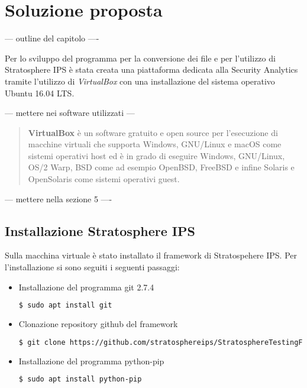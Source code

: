 \documentclass[../main.tex]{subfiles}
\begin{document}
\chapter{Soluzione proposta}

--- outline del capitolo ----

Per lo sviluppo del programma per la conversione dei file e per l'utilizzo di Stratosphere IPS è stata creata una piattaforma dedicata alla Security Analytics tramite l'utilizzo di \textit{VirtualBox} con una installazione del sistema operativo Ubuntu 16.04 LTS.

--- mettere nei software utilizzati ---
\begin{verse}
				\textbf{VirtualBox} è un software gratuito e open source per l'esecuzione di macchine virtuali che supporta Windows, GNU/Linux e macOS come sistemi operativi host ed è in grado di eseguire Windows, GNU/Linux, OS/2 Warp, BSD come ad esempio OpenBSD, FreeBSD e infine Solaris e OpenSolaris come sistemi operativi guest. 
\end{verse}

--- mettere nella sezione 5 ----
\section{Installazione Stratosphere IPS}
Sulla macchina virtuale è stato installato il framework di Stratospehere IPS. Per l'installazione si sono seguiti i seguenti passaggi:

\begin{itemize}
				\item Installazione del programma git 2.7.4
\begin{lstlisting}[language=bash]
$ sudo apt install git
\end{lstlisting}

				\item Clonazione repository github del framework
\begin{lstlisting}[language=bash]
$ git clone https://github.com/stratosphereips/StratosphereTestingFramework
\end{lstlisting}

				\item Installazione del programma python-pip
\begin{lstlisting}[language=bash]
$ sudo apt install python-pip
\end{lstlisting}
\end{itemize}
				
\end{document}
